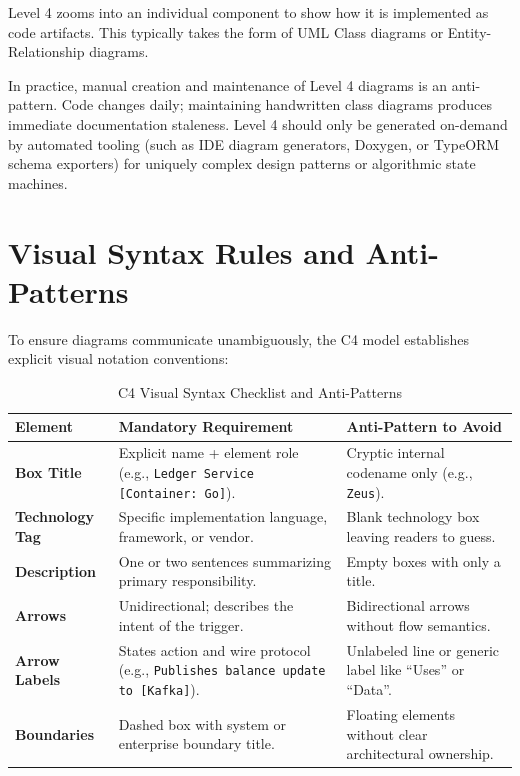 Level 4 zooms into an individual component to show how it is implemented as code artifacts. This typically takes the form of UML Class diagrams or Entity-Relationship diagrams. 

In practice, manual creation and maintenance of Level 4 diagrams is an anti-pattern. Code changes daily; maintaining handwritten class diagrams produces immediate documentation staleness. Level 4 should only be generated on-demand by automated tooling (such as IDE diagram generators, Doxygen, or TypeORM schema exporters) for uniquely complex design patterns or algorithmic state machines.

\section{Visual Syntax Rules and Anti-Patterns}

To ensure diagrams communicate unambiguously, the C4 model establishes explicit visual notation conventions:

\begin{table}[htbp]
\centering\small
\begin{tabular}{lp{5.5cm}p{5.5cm}}
\toprule
\textbf{Element} & \textbf{Mandatory Requirement} & \textbf{Anti-Pattern to Avoid} \\
\midrule
\textbf{Box Title} & Explicit name + element role (e.g., \texttt{Ledger Service [Container: Go]}). & Cryptic internal codename only (e.g., \texttt{Zeus}). \\
\textbf{Technology Tag} & Specific implementation language, framework, or vendor. & Blank technology box leaving readers to guess. \\
\textbf{Description} & One or two sentences summarizing primary responsibility. & Empty boxes with only a title. \\
\textbf{Arrows} & Unidirectional; describes the intent of the trigger. & Bidirectional arrows without flow semantics. \\
\textbf{Arrow Labels} & States action and wire protocol (e.g., \texttt{Publishes balance update to [Kafka]}). & Unlabeled line or generic label like ``Uses'' or ``Data''. \\
\textbf{Boundaries} & Dashed box with system or enterprise boundary title. & Floating elements without clear architectural ownership. \\
\bottomrule
\end{tabular}
\caption{C4 Visual Syntax Checklist and Anti-Patterns}
\label{tab:c4-syntax-checklist}
\end{table}

